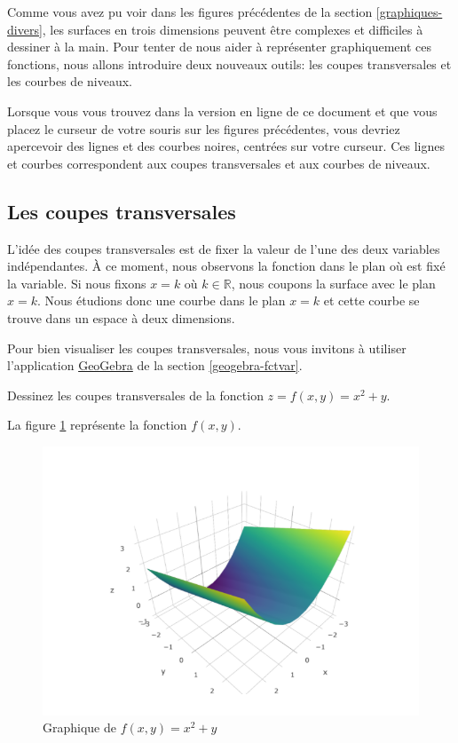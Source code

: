 \documentclass[]{book}
\theoremstyle{definition}
\theoremstyle{definition}
\theoremstyle{definition}
\theoremstyle{remark}
\let\BeginKnitrBlock\begin \let\EndKnitrBlock\end
\begin{document}
Comme vous avez pu voir dans les figures précédentes de la section
\ref{graphiques-divers}, les surfaces en trois dimensions peuvent être
complexes et difficiles à dessiner à la main. Pour tenter de nous aider
à représenter graphiquement ces fonctions, nous allons introduire deux
nouveaux outils: les coupes transversales et les courbes de niveaux.

\BeginKnitrBlock{remark}
{}Lorsque vous vous trouvez dans la version
en ligne de ce document et que vous placez le curseur de votre souris
sur les figures précédentes, vous devriez apercevoir des lignes et des
courbes noires, centrées sur votre curseur. Ces lignes et courbes
correspondent aux coupes transversales et aux courbes de niveaux.
\EndKnitrBlock{remark}

\hypertarget{les-coupes-transversales}{%
\subsection{Les coupes transversales}\label{les-coupes-transversales}}

L'idée des coupes transversales est de fixer la valeur de l'une des deux
variables indépendantes. À ce moment, nous observons la fonction dans le
plan où est fixé la variable. Si nous fixons \(x=k\) où
\(k\in\mathbb{R}\), nous coupons la surface avec le plan \(x=k\). Nous
étudions donc une courbe dans le plan \(x=k\) et cette courbe se trouve
dans un espace à deux dimensions.

Pour bien visualiser les coupes transversales, nous vous invitons à
utiliser l'application
\href{https://www.geogebra.org/?lang=fr}{GeoGebra} de la section
\ref{geogebra-fctvar}.

\BeginKnitrBlock{example}
\protect\hypertarget{exm:unnamed-chunk-124}{}{\label{exm:unnamed-chunk-124}
}Dessinez les coupes transversales de la fonction \(z=f(x,y)=x^2+y\).
\EndKnitrBlock{example}

La figure \ref{fig:fctcoupe} représente la fonction \(f(x,y)\).

\begin{figure}

{\centering \includegraphics[width=0.8\linewidth]{resources/images/fct_coupe} 

}

\caption{Graphique de $f(x,y)=x^2+y$}\label{fig:fctcoupe}
\end{figure}
\end{document}
